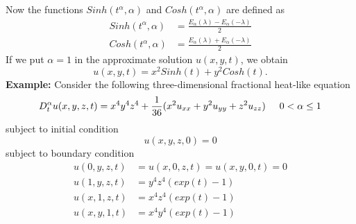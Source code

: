Now the functions $ Sinh(t^{\alpha},\alpha)$ and $ Cosh(t^{\alpha},\alpha)$ are defined as
\begin{align*}
Sinh(t^{\alpha},\alpha)&=\frac{E_{\alpha}(\lambda)-E_{\alpha}(-\lambda)}{2}\\
Cosh(t^{\alpha},\alpha)&=\frac{E_{\alpha}(\lambda)+E_{\alpha}(-\lambda)}{2}
\end{align*}
If we put $ \alpha=1 $ in the approximate solution $ u(x,y,t) $, we obtain
\begin{equation*}
u(x,y,t)=x^{2}Sinh(t)+y^{2}Cosh(t).
\end{equation*}
\textbf{Example:} Consider the following three-dimensional fractional heat-like equation
\begin{equation}
D_{t}^{\alpha}u(x,y,z,t)=x^{4}y^{4}z^{4}+\frac{1}{36}(x^{2}u_{xx}+y^{2}u_{yy}+z^{2}u_{zz}) \hspace{0.5cm} 0 < \alpha \leq 1
\end{equation}
subject to initial condition
\begin{equation}
u(x,y,z,0)=0
\end{equation}
subject to boundary condition
\begin{align*}
u(0,y,z,t)&=u(x,0,z,t)=u(x,y,0,t)=0\\
u(1,y,z,t)&=y^{4}z^{4}(exp(t)-1)\\
u(x,1,z,t)&=x^{4}z^{4}(exp(t)-1)\\
u(x,y,1,t)&=x^{4}y^{4}(exp(t)-1)
\end{align*}

